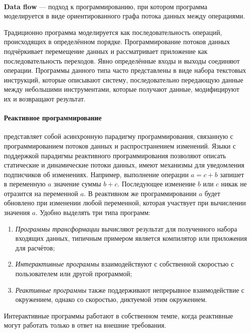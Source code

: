 \paragraph{}
\textbf{Data flow} --- подход к программированию, при котором программа моделируется в виде ориентированного графа потока данных между операциями. \cite{wiki:data-flow} 

Традиционно программа моделируется как последовательность операций, происходящих в определённом порядке. Программирование потоков данных подчёркивает перемещение данных и рассматривает приложение как последовательность переходов. Явно определённые входы и выходы соединяют операции. Программы данного типа часто представлены в виде набора текстовых инструкций, которые описывают систему, последовательно передающую данные между небольшими инструментами, которые получают данные, модифицируют их и возвращают результат. 

\paragraph{Реактивное программирование}
представляет собой асинхронную парадигму программирования, связанную с программированием потоков данных и распространением изменений. Языки с поддержкой парадигмы реактивного программирования позволяют описать статические и динамические потоки данных, имеют механизмы для уведомления подписчиков об изменениях. Например, выполнение операции \(a = c + b\) запишет в переменную \(a\) значение суммы \(b + c\). Последующее изменение \(b\) или \(c\) никак не отразится на переменной \(a\). В реактивном же программировании \(a\) будет обновлено при изменении любой переменной, которая участвует при вычислении значения \(a\).
Удобно выделять три типа программ:
\begin{enumerate}
	\item \emph{Программы трансформации} вычисляют результат для полученного набора входящих данных, типичным примером является компилятор или приложения для расчётов;
	\item \emph{Интерактивные программы} взаимодействуют с собственной скоростью с пользователем или другой программой;
	\item \emph{Реактивные программы} также поддерживают непрерывное взаимодействие с окружением, однако со скоростью, диктуемой этим окружением.
\end{enumerate}
Интерактивные программы работают в собственном темпе, когда реактивные могут работать только в ответ на внешние требования.